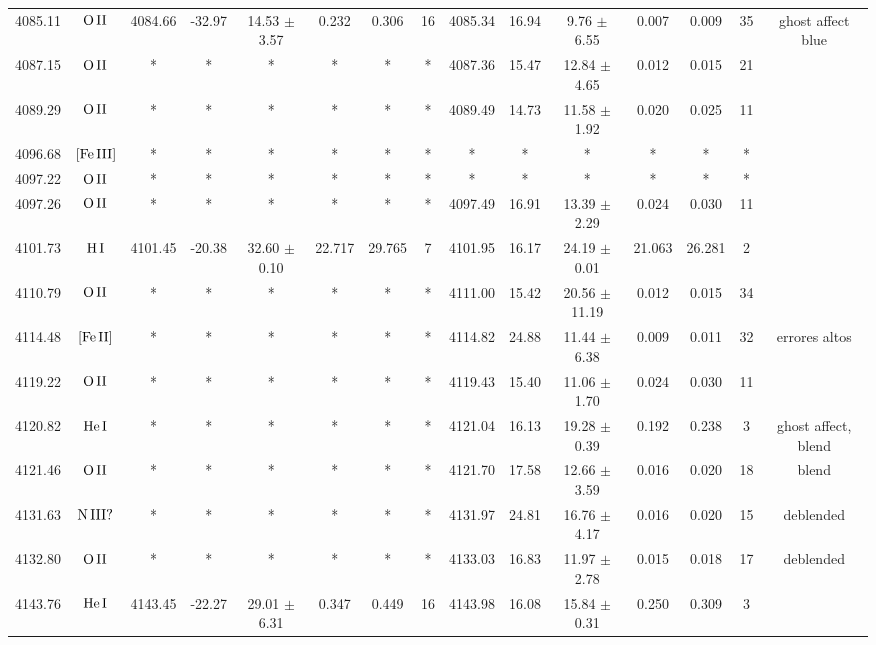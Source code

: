 \documentclass{article}
\begin{document}
\begin{table*}
\begin{adjustbox}{width=\textwidth}
\begin{tabular}{ccccccccccccccc}
4085.11 & $\mbox{O}\thinspace \mbox{II}$ & 4084.66 & -32.97 & 14.53 $\pm$ 3.57 & 0.232 & 0.306 & 16 & 4085.34 & 16.94 & 9.76 $\pm$ 6.55 & 0.007 & 0.009 & 35 &  ghost affect blue \\
4087.15 & $\mbox{O}\thinspace \mbox{II}$ & * & * & * & * & * & * & 4087.36 & 15.47 & 12.84 $\pm$ 4.65 & 0.012 & 0.015 & 21 &  \\
4089.29 & $\mbox{O}\thinspace \mbox{II}$ & * & * & * & * & * & * & 4089.49 & 14.73 & 11.58 $\pm$ 1.92 & 0.020 & 0.025 & 11 &  \\
4096.68 & $\mbox{[Fe}\thinspace \mbox{III]}$ & * & * & * & * & * & * & * & * & * & * & * & * &  \\
4097.22 & $\mbox{O}\thinspace \mbox{II}$ & * & * & * & * & * & * & * & * & * & * & * & * &  \\
4097.26 & $\mbox{O}\thinspace \mbox{II}$ & * & * & * & * & * & * & 4097.49 & 16.91 & 13.39 $\pm$ 2.29 & 0.024 & 0.030 & 11 &  \\
4101.73 & $\mbox{H}\thinspace \mbox{I}$ & 4101.45 & -20.38 & 32.60 $\pm$ 0.10 & 22.717 & 29.765 & 7 & 4101.95 & 16.17 & 24.19 $\pm$ 0.01 & 21.063 & 26.281 & 2 &  \\
4110.79 & $\mbox{O}\thinspace \mbox{II}$ & * & * & * & * & * & * & 4111.00 & 15.42 & 20.56 $\pm$ 11.19 & 0.012 & 0.015 & 34 &  \\
4114.48 & $\mbox{[Fe}\thinspace \mbox{II]}$ & * & * & * & * & * & * & 4114.82 & 24.88 & 11.44 $\pm$ 6.38 & 0.009 & 0.011 & 32 &  errores altos \\
4119.22 & $\mbox{O}\thinspace \mbox{II}$ & * & * & * & * & * & * & 4119.43 & 15.40 & 11.06 $\pm$ 1.70 & 0.024 & 0.030 & 11 &  \\
4120.82 & $\mbox{He}\thinspace \mbox{I}$ & * & * & * & * & * & * & 4121.04 & 16.13 & 19.28 $\pm$ 0.39 & 0.192 & 0.238 & 3 &  ghost affect, blend \\
4121.46 & $\mbox{O}\thinspace \mbox{II}$ & * & * & * & * & * & * & 4121.70 & 17.58 & 12.66 $\pm$ 3.59 & 0.016 & 0.020 & 18 &  blend \\
4131.63 & $\mbox{N}\thinspace \mbox{III?}$ & * & * & * & * & * & * & 4131.97 & 24.81 & 16.76 $\pm$ 4.17 & 0.016 & 0.020 & 15 &  deblended \\
4132.80 & $\mbox{O}\thinspace \mbox{II}$ & * & * & * & * & * & * & 4133.03 & 16.83 & 11.97 $\pm$ 2.78 & 0.015 & 0.018 & 17 &  deblended \\
4143.76 & $\mbox{He}\thinspace \mbox{I}$ & 4143.45 & -22.27 & 29.01 $\pm$ 6.31 & 0.347 & 0.449 & 16 & 4143.98 & 16.08 & 15.84 $\pm$ 0.31 & 0.250 & 0.309 & 3 &  \\

\end{tabular}
\end{adjustbox}
\end{table*}
\end{document}
